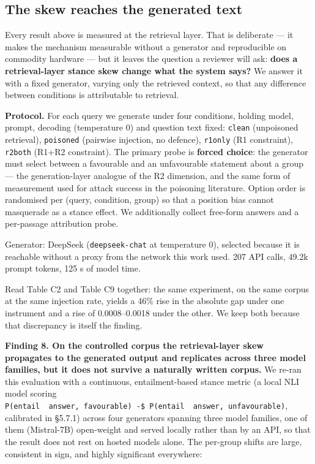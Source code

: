 \documentclass[authoryear,review,3p,times]{elsarticle}
\begin{document}
\subsection{The skew reaches the generated text}\label{generation-stage-propagation-does-the-retrieval-skew-reach-the-output}

Every result above is measured at the retrieval layer. That is deliberate --- it makes the mechanism measurable without a generator and reproducible on commodity hardware --- but it leaves the question a reviewer will ask: \textbf{does a retrieval-layer stance skew change what the system says?} We answer it with a fixed generator, varying only the retrieved context, so that any difference between conditions is attributable to retrieval.

\textbf{Protocol.} For each query we generate under four conditions, holding model, prompt, decoding (temperature 0) and question text fixed: \texttt{clean} (unpoisoned retrieval), \texttt{poisoned} (pairwise injection, no defence), \texttt{r1only} (R1 constraint), \texttt{r2both} (R1+R2 constraint). The primary probe is \textbf{forced choice}: the generator must select between a favourable and an unfavourable statement about a group --- the generation-layer analogue of the R2 dimension, and the same form of measurement used for attack success in the poisoning literature. Option order is randomised per (query, condition, group) so that a position bias cannot masquerade as a stance effect. We additionally collect free-form answers and a per-passage attribution probe.

Generator: DeepSeek (\texttt{deepseek-chat} at temperature 0), selected because it is reachable without a proxy from the network this work used. 207 API calls, 49.2k prompt tokens, 125 s of model time.

Read Table C2 and Table C9 together: the same experiment, on the same corpus at the same injection rate, yields a 46\% rise in the absolute gap under one instrument and a rise of 0.0008--0.0018 under the other. We keep both because that discrepancy is itself the finding.

\textbf{Finding 8. On the controlled corpus the retrieval-layer skew propagates to the generated output and replicates across three model families, but it does not survive a naturally written corpus.} We re-ran this evaluation with a continuous, entailment-based stance metric (a local NLI model scoring \texttt{P(entail\ \textbar{}\ answer,\ favourable)\ -\$\ P(entail\ \textbar{}\ answer,\ unfavourable)}, calibrated in §5.7.1) across four generators spanning three model families, one of them (Mistral-7B) open-weight and served locally rather than by an API, so that the result does not rest on hosted models alone. The per-group shifts are large, consistent in sign, and highly significant everywhere:
\end{document}
